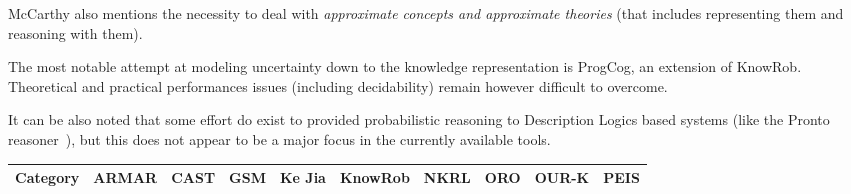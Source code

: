 \documentclass[journal]{IEEEtran}
\begin{document}
McCarthy also mentions the necessity to deal with \emph{approximate concepts
and approximate theories} (that includes representing them and reasoning with
them).

The most notable attempt at modeling uncertainty down to the knowledge
representation is {\sc ProgCog}, an extension of {\sc KnowRob}. Theoretical
and practical performances issues (including decidability) remain however
difficult to overcome.

It can be also noted that some effort do exist to provided probabilistic
reasoning to Description Logics based systems (like the {\sc Pronto}
reasoner~\cite{Klinov2008}), but this does not appear to be a major focus in the
currently available tools.


\begin{landscape}
\begin{table}\tiny
\begin{center}
\begin{tabular}{p{0.2cm}p{3.4cm}p{1.6cm}p{1.3cm}p{1.7cm}p{1.5cm}p{2cm}p{2cm}p{2cm}p{1.4cm}p{1.8cm}}
\toprule
\multicolumn{2}{c}{\bf Category}                                                     & ARMAR \cite{Holzapfel2008}& CAST \cite{Hawes2007}       & GSM \cite{Mavridis2006}     & {\sc Ke Jia} \cite{Chen2010}& {\sc KnowRob} \cite{Tenorth2009a}  & NKRL \cite{Sabri2011}                           & ORO \cite{Lemaignan2010}                      & OUR-K \cite{Lim2011}          & PEIS \cite{Daoutis2009}        \\
                                                                                                                                                                                                                                                                                                                                                                                                                   
\midrule                                                                                                                                                                                                                                                                                                                                                                                                           
                                                                                                                                                                                                                                                                                                                                                                                                                   

\end{tabular}
\end{center}
\end{table}
\end{landscape}
\end{document}

